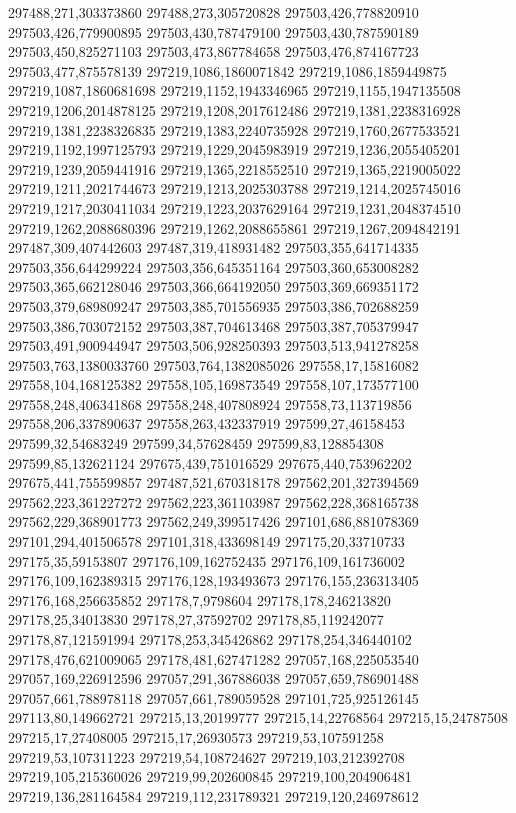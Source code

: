 297488,271,303373860
297488,273,305720828
297503,426,778820910
297503,426,779900895
297503,430,787479100
297503,430,787590189
297503,450,825271103
297503,473,867784658
297503,476,874167723
297503,477,875578139
297219,1086,1860071842
297219,1086,1859449875
297219,1087,1860681698
297219,1152,1943346965
297219,1155,1947135508
297219,1206,2014878125
297219,1208,2017612486
297219,1381,2238316928
297219,1381,2238326835
297219,1383,2240735928
297219,1760,2677533521
297219,1192,1997125793
297219,1229,2045983919
297219,1236,2055405201
297219,1239,2059441916
297219,1365,2218552510
297219,1365,2219005022
297219,1211,2021744673
297219,1213,2025303788
297219,1214,2025745016
297219,1217,2030411034
297219,1223,2037629164
297219,1231,2048374510
297219,1262,2088680396
297219,1262,2088655861
297219,1267,2094842191
297487,309,407442603
297487,319,418931482
297503,355,641714335
297503,356,644299224
297503,356,645351164
297503,360,653008282
297503,365,662128046
297503,366,664192050
297503,369,669351172
297503,379,689809247
297503,385,701556935
297503,386,702688259
297503,386,703072152
297503,387,704613468
297503,387,705379947
297503,491,900944947
297503,506,928250393
297503,513,941278258
297503,763,1380033760
297503,764,1382085026
297558,17,15816082
297558,104,168125382
297558,105,169873549
297558,107,173577100
297558,248,406341868
297558,248,407808924
297558,73,113719856
297558,206,337890637
297558,263,432337919
297599,27,46158453
297599,32,54683249
297599,34,57628459
297599,83,128854308
297599,85,132621124
297675,439,751016529
297675,440,753962202
297675,441,755599857
297487,521,670318178
297562,201,327394569
297562,223,361227272
297562,223,361103987
297562,228,368165738
297562,229,368901773
297562,249,399517426
297101,686,881078369
297101,294,401506578
297101,318,433698149
297175,20,33710733
297175,35,59153807
297176,109,162752435
297176,109,161736002
297176,109,162389315
297176,128,193493673
297176,155,236313405
297176,168,256635852
297178,7,9798604
297178,178,246213820
297178,25,34013830
297178,27,37592702
297178,85,119242077
297178,87,121591994
297178,253,345426862
297178,254,346440102
297178,476,621009065
297178,481,627471282
297057,168,225053540
297057,169,226912596
297057,291,367886038
297057,659,786901488
297057,661,788978118
297057,661,789059528
297101,725,925126145
297113,80,149662721
297215,13,20199777
297215,14,22768564
297215,15,24787508
297215,17,27408005
297215,17,26930573
297219,53,107591258
297219,53,107311223
297219,54,108724627
297219,103,212392708
297219,105,215360026
297219,99,202600845
297219,100,204906481
297219,136,281164584
297219,112,231789321
297219,120,246978612
